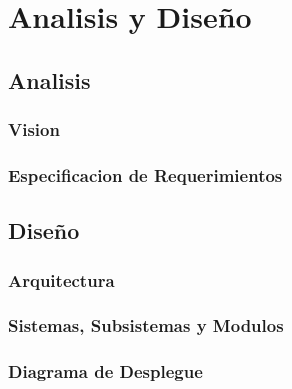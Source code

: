 
\chapter{Analisis y Diseño}
\label{capitulo3}

\section{Analisis}

\subsection{Vision}

\subsection{Especificacion de Requerimientos}

\section{Diseño}

\subsection{Arquitectura}

\subsection{Sistemas, Subsistemas y Modulos}

\subsection{Diagrama de Desplegue}
